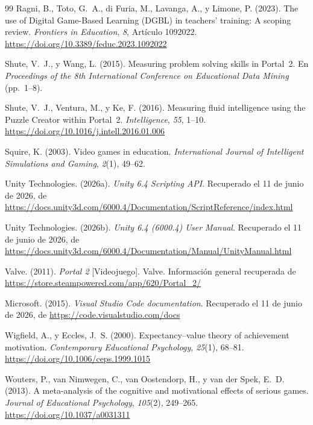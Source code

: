 \documentclass[a4paper,12pt]{article}
\begin{document}
\begin{thebibliography}{99}
Ragni, B., Toto, G.~A., di Furia, M., Lavanga, A., y Limone, P. (2023). The use of Digital Game-Based Learning (DGBL) in teachers' training: A scoping review. \textit{Frontiers in Education}, \textit{8}, Artículo 1092022. \url{https://doi.org/10.3389/feduc.2023.1092022}

Shute, V.~J., y Wang, L. (2015). Measuring problem solving skills in Portal~2. En \textit{Proceedings of the 8th International Conference on Educational Data Mining} (pp.~1--8).

Shute, V.~J., Ventura, M., y Ke, F. (2016). Measuring fluid intelligence using the Puzzle Creator within Portal~2. \textit{Intelligence}, \textit{55}, 1--10. \url{https://doi.org/10.1016/j.intell.2016.01.006}

Squire, K. (2003). Video games in education. \textit{International Journal of Intelligent Simulations and Gaming}, \textit{2}(1), 49--62.

Unity Technologies. (2026a). \textit{Unity 6.4 Scripting API}. Recuperado el 11 de junio de 2026, de \url{https://docs.unity3d.com/6000.4/Documentation/ScriptReference/index.html}

Unity Technologies. (2026b). \textit{Unity 6.4 (6000.4) User Manual}. Recuperado el 11 de junio de 2026, de \url{https://docs.unity3d.com/6000.4/Documentation/Manual/UnityManual.html}

Valve. (2011). \textit{Portal 2} [Videojuego]. Valve. Información general recuperada de \url{https://store.steampowered.com/app/620/Portal_2/}

Microsoft. (2015). \textit{Visual Studio Code documentation}. Recuperado el 11 de junio de 2026, de \url{https://code.visualstudio.com/docs}

Wigfield, A., y Eccles, J.~S. (2000). Expectancy--value theory of achievement motivation. \textit{Contemporary Educational Psychology}, \textit{25}(1), 68--81. \url{https://doi.org/10.1006/ceps.1999.1015}

Wouters, P., van Nimwegen, C., van Oostendorp, H., y van der Spek, E.~D. (2013). A meta-analysis of the cognitive and motivational effects of serious games. \textit{Journal of Educational Psychology}, \textit{105}(2), 249--265. \url{https://doi.org/10.1037/a0031311}


\end{thebibliography}
\end{document}
